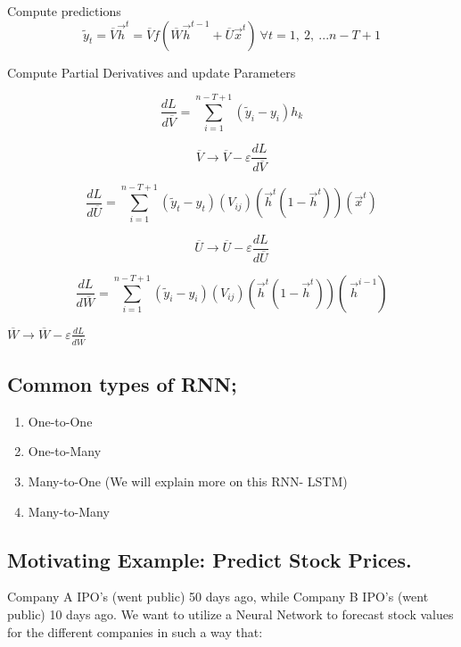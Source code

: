 \documentclass[
]{article}
\providecommand{\tightlist}{%
  \setlength{\itemsep}{0pt}\setlength{\parskip}{0pt}}
\begin{document}
Compute predictions
\[{\widetilde{y}}_{t} = \overline{V}{\overrightarrow{h}}^{t} = \overline{V}f\left( \overline{W}{\overrightarrow{h}}^{t - 1} + \overline{U}{\overrightarrow{x}}^{t} \right)\ \forall t = 1,\ 2,\ ...n - T + 1\]

Compute Partial Derivatives and update Parameters

\[\frac{dL}{d\overline{V}} = \sum_{i = 1}^{n - T + 1}{\left( {\widetilde{y}}_{i} - y_{i} \right)h_{k}}\]

\[\overline{V} \rightarrow \overline{V} - \varepsilon\frac{dL}{d\overline{V}}\]

\[\frac{dL}{d\overline{U}} = \sum_{i = 1}^{n - T + 1}{\left( {\widetilde{y}}_{t} - y_{t} \right)\left( V_{ij} \right)\left( {\overrightarrow{h}}^{t}\left( 1 - {\overrightarrow{h}}^{t} \right) \right)\left( {\overrightarrow{x}}^{t} \right)}\]

\[\overline{U} \rightarrow \overline{U} - \varepsilon\frac{dL}{d\overline{U}}\]

\[\frac{dL}{d\overline{W}} = \sum_{i = 1}^{n - T + 1}{\left( {\widetilde{y}}_{i} - y_{i} \right)\left( V_{ij} \right)\left( {\overrightarrow{h}}^{t}\left( 1 - {\overrightarrow{h}}^{t} \right) \right)\left( \ {\overrightarrow{h}}^{i - 1} \right)}\]

\(\overline{W} \rightarrow \overline{W} - \varepsilon\frac{dL}{d\overline{W}}\)

\hypertarget{common-types-of-rnn}{%
\subsection{Common types of RNN;}\label{common-types-of-rnn}}

\begin{enumerate}
\def\labelenumi{\arabic{enumi}.}
\tightlist
\item
  One-to-One
\item
  One-to-Many
\item
  Many-to-One (We will explain more on this RNN- LSTM)
\item
  Many-to-Many
\end{enumerate}

\hypertarget{motivating-example-predict-stock-prices.}{%
\subsection{Motivating Example: Predict Stock
Prices.}\label{motivating-example-predict-stock-prices.}}

Company A IPO's (went public) 50 days ago, while Company B IPO's (went
public) 10 days ago. We want to utilize a Neural Network to forecast
stock values for the different companies in such a way that:
\end{document}
